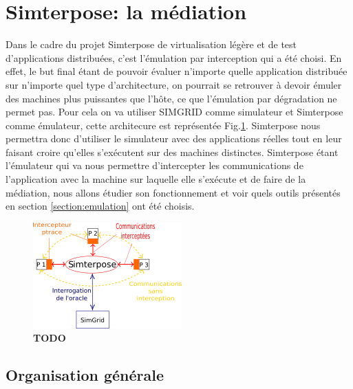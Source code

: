 
\section{Simterpose: la médiation}
\label{section:simterpose}


Dans le cadre du projet Simterpose de virtualisation légère et de test
d'applications distribuées, c'est l'émulation par interception qui a été
choisi. En effet, le but final étant de pouvoir évaluer n'importe quelle
application distribuée sur n'importe quel type d'architecture, on pourrait se
retrouver à devoir émuler des machines plus puissantes que l'hôte, ce que
l'émulation par dégradation ne permet pas. Pour cela on va utiliser SIMGRID
comme simulateur et Simterpose comme émulateur, cette architecure est représentée Fig.\ref{Organisation_generale}. Simterpose nous permettra donc
d'utiliser le simulateur avec des applications réelles tout en leur faisant
croire qu'elles s'exécutent sur des machines distinctes. Simterpose étant
l'émulateur qui va nous permettre d'intercepter les communications de
l'application avec la machine sur laquelle elle s'exécute et de faire de la
médiation, nous allons étudier son fonctionnement et voir quels outils présentés
en section \ref{section:emulation} ont été choisis.

\begin{figure}[H]
  \centering
  \includegraphics{Pictures/png/Communications_Simterpose_interprocess_v2}
  \caption{{\color{red} \textbf{TODO}}}
  \label{Organisation_generale}
\end{figure}

\subsection{Organisation générale}

